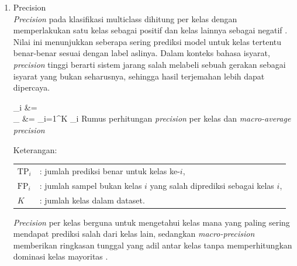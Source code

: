 \begin{enumerate}
	\item Precision \\
	\textit{Precision} pada klasifikasi multiclass dihitung per kelas dengan memperlakukan satu kelas sebagai positif dan kelas lainnya sebagai negatif \cite{Raschka2020}. Nilai ini menunjukkan seberapa sering prediksi model untuk kelas tertentu benar-benar sesuai dengan label aslinya. Dalam konteks bahasa isyarat, \textit{precision} tinggi berarti sistem jarang salah melabeli sebuah gerakan sebagai isyarat yang bukan seharusnya, sehingga hasil terjemahan lebih dapat dipercaya.\par

	\vspace{0.5cm}
	\begin{equationcaptioned}[eq:2.precision]{
		_i &=  \\
		_{} &= \sum_{i=1}^{K} _i
	}{
		Rumus perhitungan \textit{precision} per kelas dan \textit{macro-average precision}
	}\end{equationcaptioned}
	\vspace{0.5cm}

	\noindent Keterangan:

	\begin{tabular}{@{}ll}
	$\mathrm{TP}_i$ & : jumlah prediksi benar untuk kelas ke-$i$, \\
	$\mathrm{FP}_i$ & : jumlah sampel bukan kelas $i$ yang salah diprediksi sebagai kelas $i$, \\
	$K$ & : jumlah kelas dalam dataset. \\
	\end{tabular}

	\vspace{0.5cm}
	\textit{Precision} per kelas berguna untuk mengetahui kelas mana yang paling sering mendapat prediksi salah dari kelas lain, sedangkan \textit{macro-precision} memberikan ringkasan tunggal yang adil antar kelas tanpa memperhitungkan dominasi kelas mayoritas \cite{Raschka2020}.\par


\end{enumerate}
